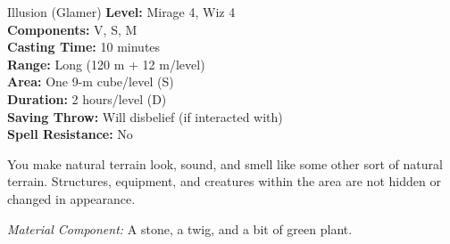 {Illusion (Glamer)}
{
	\textbf{Level:}
	Mirage 4, Wiz 4\\
	\textbf{Components:}
	V, S, M\\
	\textbf{Casting Time:}
	10 minutes\\
	\textbf{Range:}
	Long (120 m + 12 m/level)\\
	\textbf{Area:}
	One 9-m cube/level (S)\\
	\textbf{Duration:}
	2 hours/level (D)\\
	\textbf{Saving Throw:}
	Will disbelief (if interacted with)\\
	\textbf{Spell Resistance:}
	No\\
}
{
	You make natural terrain look, sound, and smell like some other sort of natural terrain. Structures, equipment, and creatures within the area are not hidden or changed in appearance.

	\textit{Material Component:}
	A stone, a twig, and a bit of green plant.

}
